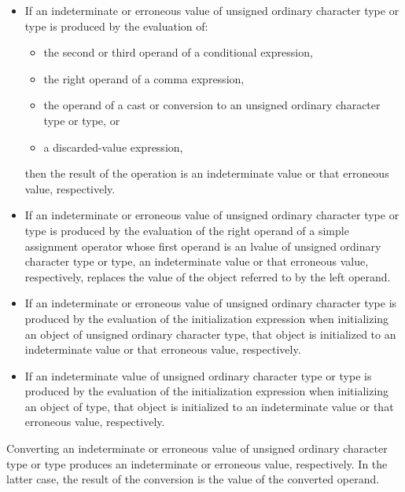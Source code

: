\begin{adjustwidth}{0.5cm}{0.5cm}
\begin{itemize}
\item
  If an indeterminate or erroneous value of
  unsigned ordinary character type
  or  type
  is produced by the evaluation of:
  \begin{itemize}
  \item
    the second or third operand of a conditional expression,
  \item
    the right operand of a comma expression,
  \item
    the operand of a cast or conversion
    to an unsigned ordinary character type
    or  type, or
  \item
    a discarded-value expression,
  \end{itemize}
  then the result of the operation is an indeterminate value or
  that erroneous value, respectively.
\item
  If an indeterminate or erroneous value of
  unsigned ordinary character type or  type
  is produced by the evaluation of
  the right operand of a simple assignment operator
  whose first operand is an lvalue of
  unsigned ordinary character type or  type,
  an indeterminate value or that erroneous value, respectively, replaces
  the value of the object referred to by the left operand.
\item
  If an indeterminate or erroneous value of unsigned ordinary character type
  is produced by the evaluation of the initialization expression
  when initializing an object of unsigned ordinary character type,
  that object is initialized to an indeterminate
  value or that erroneous value, respectively.
\item
  If an indeterminate value of
  unsigned ordinary character type or  type
  is produced by the evaluation of the initialization expression
  when initializing an object of  type,
  that object is initialized to an indeterminate value or
  that erroneous value, respectively.
\end{itemize}
Converting an indeterminate or erroneous value of
unsigned ordinary character type or  type
produces an indeterminate or erroneous value, respectively.
In the latter case,
the result of the conversion is the value of the converted operand.

\end{adjustwidth}


